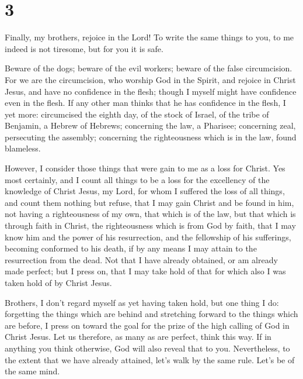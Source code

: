 \hypertarget{section-2}{%
\section{3}\label{section-2}}

 Finally, my brothers, rejoice in the Lord! To write the
same things to you, to me indeed is not tiresome, but for you it is
safe.

 Beware of the dogs; beware of the evil workers; beware of
the false circumcision.  For we are the circumcision, who
worship God in the Spirit, and rejoice in Christ Jesus, and have no
confidence in the flesh;  though I myself might have
confidence even in the flesh. If any other man thinks that he has
confidence in the flesh, I yet more:  circumcised the eighth
day, of the stock of Israel, of the tribe of Benjamin, a Hebrew of
Hebrews; concerning the law, a Pharisee;  concerning zeal,
persecuting the assembly; concerning the righteousness which is in the
law, found blameless.

 However, I consider those things that were gain to me as a
loss for Christ.  Yes most certainly, and I count all things
to be a loss for the excellency of the knowledge of Christ Jesus, my
Lord, for whom I suffered the loss of all things, and count them nothing
but refuse, that I may gain Christ  and be found in him, not
having a righteousness of my own, that which is of the law, but that
which is through faith in Christ, the righteousness which is from God by
faith,  that I may know him and the power of his
resurrection, and the fellowship of his sufferings, becoming conformed
to his death,  if by any means I may attain to the
resurrection from the dead.  Not that I have already
obtained, or am already made perfect; but I press on, that I may take
hold of that for which also I was taken hold of by Christ Jesus.

 Brothers, I don't regard myself as yet having taken hold,
but one thing I do: forgetting the things which are behind and
stretching forward to the things which are before,  I press
on toward the goal for the prize of the high calling of God in Christ
Jesus.  Let us therefore, as many as are perfect, think
this way. If in anything you think otherwise, God will also reveal that
to you.  Nevertheless, to the extent that we have already
attained, let's walk by the same rule. Let's be of the same mind.

